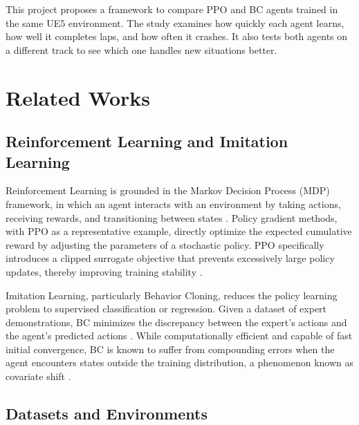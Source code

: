 \documentclass[conference]{IEEEtran}
\begin{document}
This project proposes a framework to compare PPO and BC agents trained in the same UE5 environment. The study examines how quickly each agent learns, how well it completes laps, and how often it crashes. It also tests both agents on a different track to see which one handles new situations better.

\section{Related Works}


\subsection{Reinforcement Learning and Imitation Learning}

Reinforcement Learning is grounded in the Markov Decision Process (MDP) framework, in which an agent interacts with an environment by taking actions, receiving rewards, and transitioning between states \cite{mnih2015human}. 
Policy gradient methods, with PPO as a representative example, directly optimize the expected cumulative reward by adjusting the parameters of a stochastic policy. PPO specifically introduces a clipped surrogate objective that prevents excessively large policy updates, thereby improving training stability \cite{schulman2017proximal}.

\text Imitation Learning, particularly Behavior Cloning, reduces the policy learning problem to supervised classification or regression. Given a dataset of expert demonstrations, BC minimizes the discrepancy between the expert's actions and the agent's predicted actions \cite{chen2024endtoend}. While computationally efficient and capable of fast initial convergence, BC is known to suffer from compounding errors when the agent encounters states outside the training distribution, a phenomenon known as covariate shift \cite{ross2011reduction}.

\subsection{Datasets and Environments}
\end{document}
